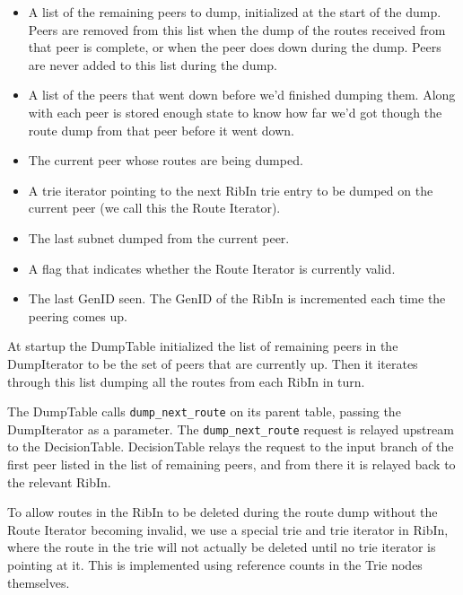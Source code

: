 \documentclass[11pt]{article}
\begin{document}
\begin{itemize}

  \item A list of the remaining peers to dump, initialized at the start
  of the dump.  Peers are removed from this list when the dump of the
  routes received from that peer is complete, or when the peer does down
  during the dump.  Peers are never added to this list during the dump.

  \item A list of the peers that went down before we'd finished dumping
  them.  Along with each peer is stored enough state to know how far
  we'd got though the route dump from that peer before it went down.

  \item The current peer whose routes are being dumped.

  \item A trie iterator pointing to the next RibIn trie entry to be dumped
  on the current peer (we call this the Route Iterator).

  \item The last subnet dumped from the current peer.

  \item A flag that indicates whether the Route Iterator is currently
  valid.

  \item The last GenID seen.  The GenID of the RibIn is incremented each
  time the peering comes up.

\end{itemize}

At startup the DumpTable initialized the list of remaining peers in
the DumpIterator to be the set of peers that are currently up.  Then
it iterates through this list dumping all the routes from each RibIn
in turn.

The DumpTable calls {\tt dump\_next\_route} on its parent table, passing the
DumpIterator as a parameter.  The {\tt dump\_next\_route} request is relayed
upstream to the DecisionTable.  DecisionTable relays the request to
the input branch of the first peer listed in the list of remaining
peers, and from there it is relayed back to the relevant RibIn.

To allow routes in the RibIn to be deleted during the route dump
without the Route Iterator becoming invalid, we use a special trie and
trie iterator in RibIn, where the route in the trie will not actually
be deleted until no trie iterator is pointing at it.  This is
implemented using reference counts in the Trie nodes themselves.
\end{document}
